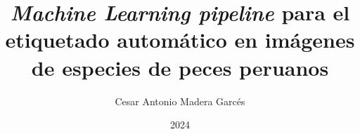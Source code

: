 \documentclass[a4paper, 12pt, oneside]{tesisutec}
\begin{document}
\frontmatter
{}

\title {\textit{Machine Learning pipeline} para el etiquetado 
automático en imágenes de especies 
de peces peruanos}
\author{Cesar Antonio Madera Garcés } %


\date{2024}


\maketitle
{}




\tableofcontents
\newpage
\listoftables
\newpage
\listoffigures


\mainmatter
\pagestyle{fancy}










\renewcommand{\bibname}{\large\bf{REFERENCIAS BIBLIOGR\'AFICAS}}
\end{document}
